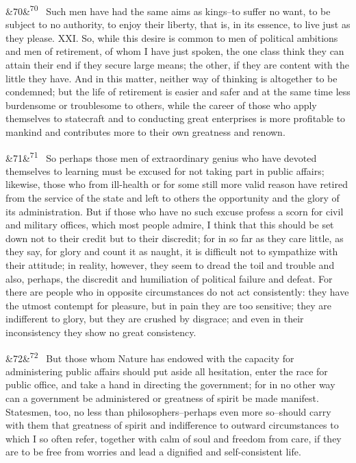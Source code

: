 \documentclass[12pt]{article}
\newcommand{\para}[1][]{\par\noindent\ifx&#1&\else\textsuperscript{\footnotesize #1}~\fi}
\begin{document}
\para[70] Such men have had the same aims as kings--to suffer no want, to be subject to no authority, to enjoy their liberty, that is, in its essence, to live just as they please. XXI. So, while this desire is common to men of political ambitions and men of retirement, of whom I have just spoken, the one class think they can attain their end if they secure large means; the other, if they are content with the little they have. And in this matter, neither way of thinking is altogether to be condemned; but the life of retirement is easier and safer and at the same time less burdensome or troublesome to others, while the career of those who apply themselves to statecraft and to conducting great enterprises is more profitable to mankind and contributes more to their own greatness and renown.

\para[71] So perhaps those men of extraordinary genius who have devoted themselves to learning must be excused for not taking part in public affairs; likewise, those who from ill-health or for some still more valid reason have retired from the service of the state and left to others the opportunity and the glory of its administration. But if those who have no such excuse profess a scorn for civil and military offices, which most people admire, I think that this should be set down not to their credit but to their discredit; for in so far as they care little, as they say, for glory and count it as naught, it is difficult not to sympathize with their attitude; in reality, however, they seem to dread the toil and trouble and also, perhaps, the discredit and humiliation of political failure and defeat. For there are people who in opposite circumstances do not act consistently: they have the utmost contempt for pleasure, but in pain they are too sensitive; they are indifferent to glory, but they are crushed by disgrace; and even in their inconsistency they show no great consistency.

\para[72] But those whom Nature has endowed with the capacity for administering public affairs should put aside all hesitation, enter the race for public office, and take a hand in directing the government; for in no other way can a government be administered or greatness of spirit be made manifest. Statesmen, too, no less than philosophers--perhaps even more so--should carry with them that greatness of spirit and indifference to outward circumstances to which I so often refer, together with calm of soul and freedom from care, if they are to be free from worries and lead a dignified and self-consistent life.
\end{document}
